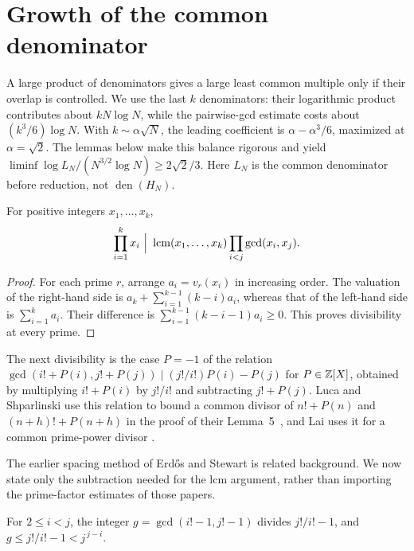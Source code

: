 \documentclass[11pt]{article}
\newcommand{\Lc}{L}
\newcommand{\den}{\operatorname{den}}
\begin{document}
\section{Growth of the common denominator}\label{long68:sec:lcm}

A large product of denominators gives a large least common multiple
only if their overlap is controlled. We use the last $k$ denominators:
their logarithmic product contributes about $kN\log N$, while the
pairwise-gcd estimate costs about $(k^3/6)\log N$. With
$k\sim\alpha\sqrt N$, the leading coefficient is
$\alpha-\alpha^3/6$, maximized at $\alpha=\sqrt2$.
The lemmas below make this balance rigorous and yield
$\liminf\log\Lc_N/(N^{3/2}\log N)\ge2\sqrt2/3$.
Here $\Lc_N$ is the common denominator before reduction, not
$\den(H_N)$.

\begin{lemma}
\label{long68:res:product-lcm}
For positive integers $x_1,\ldots,x_k$,
\[
 \prod_{i=1}^{k}x_i\ \Big|\ \lcm(x_1,\ldots,x_k)\prod_{i<j}\gcd(x_i,x_j).
\]
\end{lemma}

\begin{proof}
For each prime $r$, arrange $a_i=v_r(x_i)$ in increasing order.
The valuation of the right-hand side is
$a_k+\sum_{i=1}^{k-1}(k-i)a_i$, whereas that of the left-hand side is
$\sum_{i=1}^k a_i$. Their difference is
$\sum_{i=1}^{k-1}(k-i-1)a_i\ge0$. This proves divisibility at every prime.
\end{proof}

\noindent The next divisibility is the case $P=-1$ of the relation
$\gcd(i!+P(i),j!+P(j))\mid (j!/i!)P(i)-P(j)$ for $P\in\mathbb{Z}[X]$, obtained by
multiplying $i!+P(i)$ by $j!/i!$ and subtracting $j!+P(j)$.  Luca and
Shparlinski use this relation to bound a common divisor of $n!+P(n)$ and
$(n+h)!+P(n+h)$ in the proof of their Lemma~5~\cite{luca-shparlinski}, and Lai
uses it for a common prime-power divisor
\cite[proof of Lemma~2.4, display~(2.5)]{lai}.

The earlier spacing method of Erd\H{o}s and Stewart
\cite[\S3, pp.~516--517]{erdos-stewart1976} is related background.
We now state only the subtraction needed for the lcm argument, rather than
importing the prime-factor estimates of those papers.

\begin{lemma}\label{long68:res:gap-gcd}
For $2\le i<j$, the integer $g=\gcd(i!-1,j!-1)$ divides $j!/i!-1$, and
$g\le j!/i!-1<j^{\,j-i}$.
\end{lemma}
\end{document}
